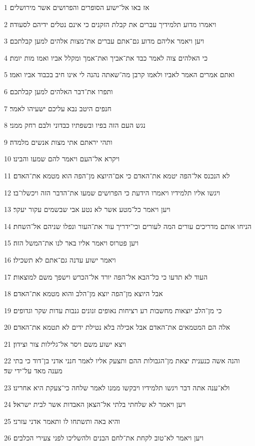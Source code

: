 \par 1 אז באו אל־ישוע הסופרים והפרושים אשר מירושלים׃
\par 2 ויאמרו מדוע תלמידיך עברים את קבלת הזקנים כי אינם נטלים ידיהם לסעודה׃
\par 3 ויען ויאמר אליהם מדוע גם־אתם עברים את־מצות אלהים למען קבלתכם׃
\par 4 כי האלהים צוה לאמר כבד את־אביך ואת־אמך ומקלל אביו ואמו מות יומת׃
\par 5 ואתם אמרים האמר לאביו ולאמו קרבן מה־שאתה נהנה לי אינו חיב בכבוד אביו ואמו׃
\par 6 ותפרו את־דבר האלהים למען קבלתכם׃
\par 7 חנפים היטב נבא עליכם ישעיהו לאמר׃
\par 8 נגש העם הזה בפיו ובשפתיו כבדוני ולבם רחק ממני׃
\par 9 ותהי יראתם אתי מצות אנשים מלמדה׃
\par 10 ויקרא אל־העם ויאמר להם שמעו והבינו׃
\par 11 לא הנכנס אל־הפה יטמא את־האדם כי אם־היוצא מן־הפה הוא מטמא את־האדם׃
\par 12 ויגשו אליו תלמידיו ויאמרו הידעת כי הפרושים שמעו את־הדבר הזה ויכשלו־בו׃
\par 13 ויען ויאמר כל־מטע אשר לא נטע אבי שבשמים עקור יעקר׃
\par 14 הניחו אותם מדריכים עורים המה לעורים וכי־ידריך עור את־העור ונפלו שניהם אל־השחת׃
\par 15 ויען פטרוס ויאמר אליו באר לנו את־המשל הזה׃
\par 16 ויאמר ישוע עדנה גם־אתם לא תשכילו׃
\par 17 העוד לא תדעו כי כל־הבא אל־הפה יורד אל־הכרש וישפך משם למוצאות׃
\par 18 אבל היוצא מן־הפה יוצא מן־הלב והוא מטמא את־האדם׃
\par 19 כי מן־הלב יוצאות מחשבות רע רציחות נאופים זנונים גנבות עדות שקר וגדופים׃
\par 20 אלה הם המטמאים את־האדם אבל אכילה בלא נטילת ידים לא תטמא את־האדם׃
\par 21 ויצא ישוע משם ויסר אל־גלילות צור וצידון׃
\par 22 והנה אשה כנענית יצאת מן־הגבולות ההם ותצעק אליו לאמר חנני אדני בן־דוד כי בתי מענה מאד על־ידי שד׃
\par 23 ולא־ענה אתה דבר ויגשו תלמידיו ויבקשו ממנו לאמר שלחה כי־צעקת היא אחרינו׃
\par 24 ויען ויאמר לא שלחתי בלתי אל־הצאן האבדות אשר לבית ישראל׃
\par 25 והיא באה ותשתחו לו ותאמר אדני עזרני׃
\par 26 ויען ויאמר לא־טוב לקחת את־לחם הבנים ולהשליכו לפני צעירי הכלבים׃
